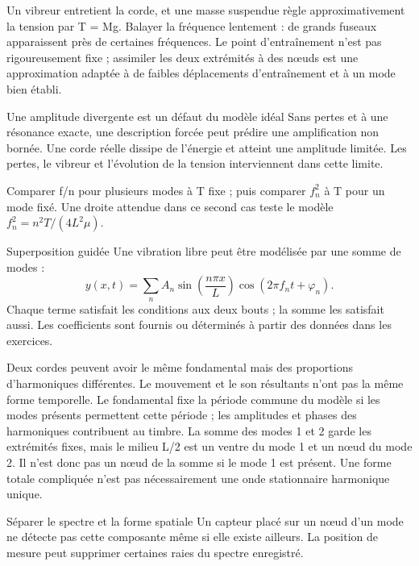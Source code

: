 Un vibreur entretient la corde, et une masse suspendue règle approximativement la tension par T = Mg. Balayer la fréquence lentement : de grands fuseaux apparaissent près de certaines fréquences. Le point d’entraînement n’est pas rigoureusement fixe ; assimiler les deux extrémités à des nœuds est une approximation adaptée à de faibles déplacements d’entraînement et à un mode bien établi.
\begin{piege}{Une amplitude divergente est un défaut du modèle idéal}
Sans pertes et à une résonance exacte, une description forcée peut prédire une amplification non bornée. Une corde réelle dissipe de l’énergie et atteint une amplitude limitée. Les pertes, le vibreur et l’évolution de la tension interviennent dans cette limite.
\end{piege}
Comparer f/n pour plusieurs modes à T fixe ; puis comparer $f_n^2$ à T pour un mode fixé. Une droite attendue dans ce second cas teste le modèle $f_n^2=n^2T/(4L^2\mu)$.


\begin{loi}{Superposition guidée}
Une vibration libre peut être modélisée par une somme de modes :\[y(x,t)=\sum_n A_n\sin\left(\frac{n\pi x}{L}\right)\cos(2\pi f_nt+\varphi_n).\]Chaque terme satisfait les conditions aux deux bouts ; la somme les satisfait aussi. Les coefficients sont fournis ou déterminés à partir des données dans les exercices.
\end{loi}
Deux cordes peuvent avoir le même fondamental mais des proportions d’harmoniques différentes. Le mouvement et le son résultants n’ont pas la même forme temporelle. Le fondamental fixe la période commune du modèle si les modes présents permettent cette période ; les amplitudes et phases des harmoniques contribuent au timbre.
La somme des modes 1 et 2 garde les extrémités fixes, mais le milieu L/2 est un ventre du mode 1 et un nœud du mode 2. Il n’est donc pas un nœud de la somme si le mode 1 est présent. Une forme totale compliquée n’est pas nécessairement une onde stationnaire harmonique unique.
\begin{methode}{Séparer le spectre et la forme spatiale}
Un capteur placé sur un nœud d’un mode ne détecte pas cette composante même si elle existe ailleurs. La position de mesure peut supprimer certaines raies du spectre enregistré.
\end{methode}


